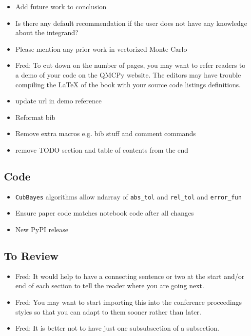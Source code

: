 \documentclass[graybox]{svmult}
\newcommand{\AGSComment}[1]{{\color{brown} #1}}
\newcommand{\JRComment}[1]{{\color{violet}#1}}
\newcommand{\FJHComment}[1]{{\color{purple}Fred:  #1}}
\begin{document}
\begin{itemize}
    \item \AGSComment{Add future work to conclusion}
    \item \JRComment{Is there any default recommendation if the user does not have any knowledge about the integrand?}
    \item \JRComment{Please mention any prior work in vectorized Monte Carlo}
    \item \FJHComment{To cut down on the number of pages, you may want to refer readers to a demo of your code on the QMCPy website.  The editors may have trouble compiling the LaTeX of the book with your source code listings definitions.}
    \item \AGSComment{update url in demo reference}
    \item \AGSComment{Reformat bib}
    \item \AGSComment{Remove extra macros e.g. bib stuff and comment commands}
    \item \AGSComment{remove TODO section and table of contents from the end}
\end{itemize}

\subsection*{Code}

\begin{itemize}
    \item \AGSComment{\texttt{CubBayes} algorithms allow ndarray of \texttt{abs\_tol} and \texttt{rel\_tol} and \texttt{error\_fun}}
    \item \AGSComment{Ensure paper code matches notebook code after all changes}
    \item \AGSComment{New PyPI release}
\end{itemize}

\subsection*{To Review}

\begin{itemize}
    \item \FJHComment{It would help to have a connecting sentence or two at the start and/or end of each section to tell the reader where you are going next.}
    \item \FJHComment{You may want to start importing this into the conference proceedings styles so that you can adapt to them sooner rather than later.}
    \item \FJHComment{It is better not to have just one subsubsection of a subsection.}
\end{itemize}

\tableofcontents
\end{document}
